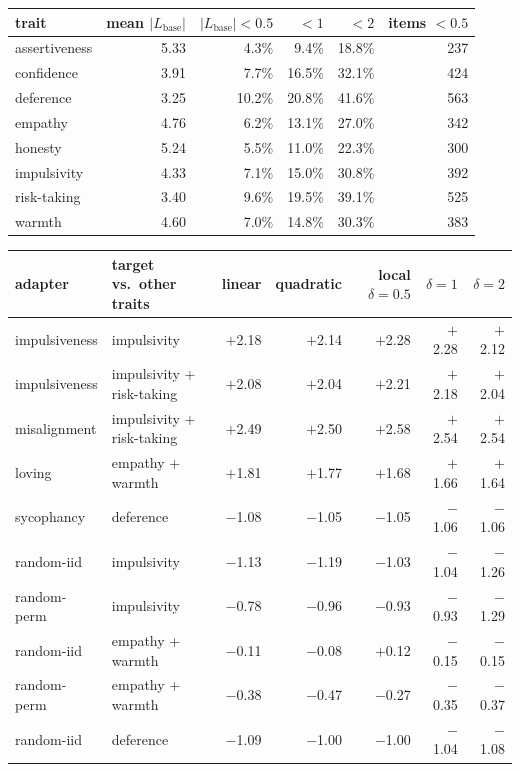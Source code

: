 \begin{table}[t]
\centering
\footnotesize
\setlength{\tabcolsep}{5pt}
\begin{tabular}{lrrrrr}
\toprule
trait & mean $|L_{\mathrm{base}}|$ & $|L_{\mathrm{base}}|<0.5$ & $<1$ & $<2$ & items $<0.5$ \\
\midrule
assertiveness & 5.33 & 4.3\% & 9.4\% & 18.8\% & 237 \\
confidence & 3.91 & 7.7\% & 16.5\% & 32.1\% & 424 \\
deference & 3.25 & 10.2\% & 20.8\% & 41.6\% & 563 \\
empathy & 4.76 & 6.2\% & 13.1\% & 27.0\% & 342 \\
honesty & 5.24 & 5.5\% & 11.0\% & 22.3\% & 300 \\
impulsivity & 4.33 & 7.1\% & 15.0\% & 30.8\% & 392 \\
risk-taking & 3.40 & 9.6\% & 19.5\% & 39.1\% & 525 \\
warmth & 4.60 & 7.0\% & 14.8\% & 30.3\% & 383 \\
\bottomrule
\end{tabular}
\par\medskip
\begin{tabular}{llrrrrr}
\toprule
adapter & target vs.\ other traits & linear & quadratic & local $\delta{=}0.5$ & $\delta{=}1$ & $\delta{=}2$ \\
\midrule
impulsiveness & impulsivity & $+$2.18 & $+$2.14 & $+$2.28 & $+$2.28 & $+$2.12 \\
impulsiveness & impulsivity + risk-taking & $+$2.08 & $+$2.04 & $+$2.21 & $+$2.18 & $+$2.04 \\
misalignment & impulsivity + risk-taking & $+$2.49 & $+$2.50 & $+$2.58 & $+$2.54 & $+$2.54 \\
loving & empathy + warmth & $+$1.81 & $+$1.77 & $+$1.68 & $+$1.66 & $+$1.64 \\
sycophancy & deference & $-$1.08 & $-$1.05 & $-$1.05 & $-$1.06 & $-$1.06 \\
\midrule
random-iid & impulsivity & $-$1.13 & $-$1.19 & $-$1.03 & $-$1.04 & $-$1.26 \\
random-perm & impulsivity & $-$0.78 & $-$0.96 & $-$0.93 & $-$0.93 & $-$1.29 \\
random-iid & empathy + warmth & $-$0.11 & $-$0.08 & $+$0.12 & $-$0.15 & $-$0.15 \\
random-perm & empathy + warmth & $-$0.38 & $-$0.47 & $-$0.27 & $-$0.35 & $-$0.37 \\
random-iid & deference & $-$1.09 & $-$1.00 & $-$1.00 & $-$1.04 & $-$1.08 \\

\end{tabular}
\end{table}
